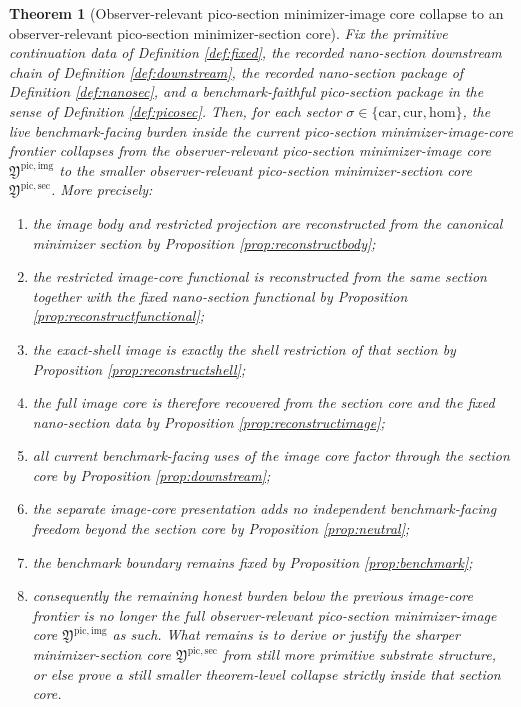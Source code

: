 \documentclass[11pt]{article}
\newcommand{\Car}{\mathrm{car}}
\newcommand{\Cur}{\mathrm{cur}}
\newcommand{\Hom}{\mathrm{hom}}
\newcommand{\PicoImageCore}{\mathfrak Y^{\mathrm{pic,img}}}
\newcommand{\PicoMinSectionCore}{\mathfrak Y^{\mathrm{pic,sec}}}
\newtheorem{theorem}{Theorem}
\begin{document}
\begin{theorem}[Observer-relevant pico-section minimizer-image core collapse to an observer-relevant pico-section minimizer-section core]
\label{thm:main}
Fix the primitive continuation data of Definition \ref{def:fixed}, the recorded nano-section downstream chain of Definition \ref{def:downstream}, the recorded nano-section package of Definition \ref{def:nanosec}, and a benchmark-faithful pico-section package in the sense of Definition \ref{def:picosec}. Then, for each sector \(\sigma\in\{\Car,\Cur,\Hom\}\), the live benchmark-facing burden inside the current pico-section minimizer-image-core frontier collapses from the observer-relevant pico-section minimizer-image core \(\PicoImageCore\) to the smaller observer-relevant pico-section minimizer-section core \(\PicoMinSectionCore\). More precisely:
\begin{enumerate}
    \item the image body and restricted projection are reconstructed from the canonical minimizer section by Proposition \ref{prop:reconstructbody};
    \item the restricted image-core functional is reconstructed from the same section together with the fixed nano-section functional by Proposition \ref{prop:reconstructfunctional};
    \item the exact-shell image is exactly the shell restriction of that section by Proposition \ref{prop:reconstructshell};
    \item the full image core is therefore recovered from the section core and the fixed nano-section data by Proposition \ref{prop:reconstructimage};
    \item all current benchmark-facing uses of the image core factor through the section core by Proposition \ref{prop:downstream};
    \item the separate image-core presentation adds no independent benchmark-facing freedom beyond the section core by Proposition \ref{prop:neutral};
    \item the benchmark boundary remains fixed by Proposition \ref{prop:benchmark};
    \item consequently the remaining honest burden below the previous image-core frontier is no longer the full observer-relevant pico-section minimizer-image core \(\PicoImageCore\) as such. What remains is to derive or justify the sharper minimizer-section core \(\PicoMinSectionCore\) from still more primitive substrate structure, or else prove a still smaller theorem-level collapse strictly inside that section core.
\end{enumerate}
\end{theorem}
\end{document}
